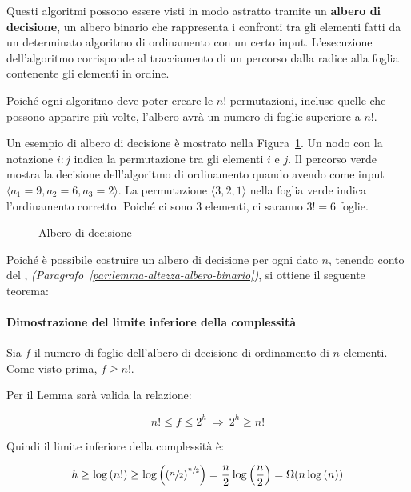\documentclass[italian, 10pt]{article}
\begin{document}
Questi algoritmi possono essere visti in modo astratto tramite un \textbf{albero di decisione}, un albero binario che rappresenta i confronti tra gli elementi fatti da un determinato algoritmo di ordinamento con un certo input.
L'esecuzione dell'algoritmo corrisponde al tracciamento di un percorso dalla radice alla foglia contenente gli elementi in ordine.

Poiché ogni algoritmo deve poter creare le \(n!\) permutazioni, incluse quelle che possono apparire più volte, l'albero avrà un numero di foglie superiore a \(n!\).

\bigskip
Un esempio di albero di decisione è mostrato nella Figura~\ref{fig:albero-di-decisione-esempio}.
Un nodo con la notazione \(i : j\) indica la permutazione tra gli elementi \(i\) e \(j\). Il percorso verde mostra la decisione dell'algoritmo di ordinamento quando avendo come input \(\langle a_1 = 9, a_2 = 6, a_3  = 2\rangle\). La permutazione \(\langle 3, 2, 1 \rangle\) nella foglia verde indica l'ordinamento corretto. Poiché ci sono \(3\) elementi, ci saranno \(3! = 6\) foglie.

\begin{figure}[htbp]
  \bigskip
  \centering
  \caption{Albero di decisione}
  \label{fig:albero-di-decisione-esempio}
  \bigskip
\end{figure}

Poiché è possibile costruire un albero di decisione per ogni dato \(n\), tenendo conto del , \textit{(Paragrafo~\ref{par:lemma-altezza-albero-binario})}, si ottiene il seguente teorema:


\paragraph{Dimostrazione del limite inferiore della complessità}

Sia \(f\) il numero di foglie dell'albero di decisione di ordinamento di \(n\) elementi.
Come visto prima, \(f \geq n!\).

Per il Lemma sarà valida la relazione:

\[ n! \leq f \leq 2^h \ \Rightarrow \ 2^h \geq n! \]

Quindi il limite inferiore della complessità è:

\[ h \geq \log{(n!)} \geq \log\left(\left(\sfrac{n}{2}\right)^{\sfrac{n}{2}}\right) = \dfrac{n}{2} \log\left(\dfrac{n}{2}\right) = \Omega(n \log{(n)} )\]
\end{document}
